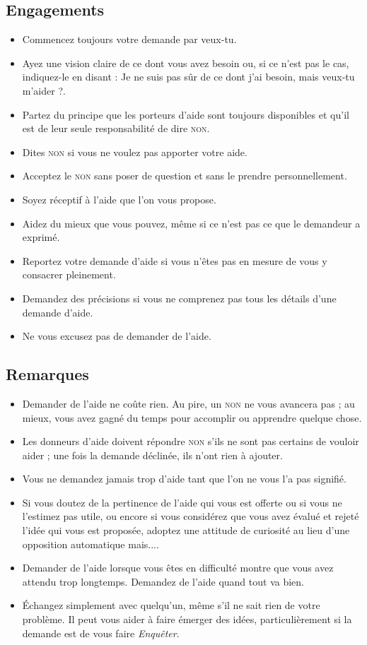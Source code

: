 \documentclass[paper=6in:9in,pagesize=pdftex,headinclude=on,footinclude=on,11pt]{scrbook}
\begin{document}
\subsection{Engagements}
\begin{itemize}
	\item Commencez toujours votre demande par \og{}veux-tu\fg{}.
	\item Ayez une vision claire de ce dont vous avez besoin ou, si ce n'est pas le cas, indiquez-le en disant : \og{}Je ne suis pas sûr
	      de ce dont j'ai besoin, mais veux-tu m'aider ?\fg{}.
    \item Partez du principe que les porteurs d'aide sont toujours disponibles et qu'il est de leur seule responsabilité de dire \textsc{non}.
    \item Dites \textsc{non} si vous ne voulez pas apporter votre aide.
    \item Acceptez le \textsc{non} sans poser de question et sans le prendre personnellement.
    \item Soyez réceptif à l'aide que l'on vous propose.
    \item Aidez du mieux que vous pouvez, même si ce n'est pas ce que le demandeur a exprimé.
    \item Reportez votre demande d'aide si vous n'êtes pas en mesure de vous y consacrer pleinement.
    \item Demandez des précisions si vous ne comprenez pas tous les détails d'une demande d'aide.
    \item Ne vous excusez pas de demander de l'aide.
\end{itemize}

\subsection{Remarques}
\begin{itemize}
	\item Demander de l'aide ne coûte rien. Au pire, un \textsc{non} ne vous avancera pas ; au mieux, vous avez gagné du temps pour
	      accomplir ou apprendre quelque chose.
	\item Les donneurs d'aide doivent répondre \textsc{non} s'ils ne sont pas certains de vouloir aider ; une fois la demande déclinée,
	      ils n'ont rien à ajouter.
	\item Vous ne demandez jamais \og{}trop\fg{} d'aide tant que l'on ne vous l'a pas signifié.
	\item Si vous doutez de la pertinence de l'aide qui vous est offerte ou si vous ne l'estimez pas utile, ou encore si vous considérez
	      que vous avez évalué et rejeté l'idée qui vous est proposée, adoptez une attitude de curiosité au lieu d'une opposition automatique
	      \og{}mais...\fg{}.
	\item Demander de l'aide lorsque vous êtes en difficulté montre que vous avez attendu trop longtemps. Demandez de l'aide quand tout va bien.
	\item Échangez simplement avec quelqu'un, même s'il ne sait rien de votre problème. Il peut vous aider à faire émerger des idées,
	      particulièrement si la demande est de vous faire \emph{Enquêter}.
\end{itemize}
\end{document}
